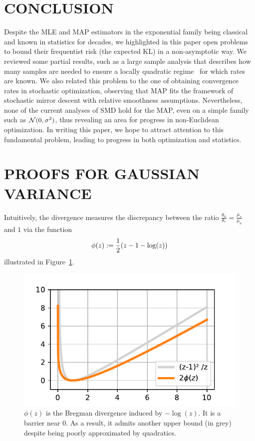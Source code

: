 \documentclass[twoside]{article}
\let\oldsection\section
\renewcommand{\section}[1]{\oldsection{\texorpdfstring{\uppercase{#1}}{#1}}}
\newcommand{\nat}{\theta}
\newcommand{\m}{\mu}
\begin{document}
\section{Conclusion}
Despite the MLE and MAP estimators in the exponential family being classical and known in statistics for decades, we highlighted in this paper open problems to bound their frequentist risk (the expected KL) in a non-asymptotic way. We reviewed some partial results, such as a large sample analysis that describes how many samples are needed to ensure a locally quadratic regime~\citep{kakade2010learning, ostrovskii2021finite} for which rates are known. We also related this problem to the one of obtaining convergence rates in stochastic optimization, observing that MAP fits the framework of stochastic mirror descent with relative smoothness assumptions. 
Nevertheless, none of the current analyses of SMD hold for the MAP, even on a simple family such as ${\mathcal N}(0,\sigma^2)$, thus revealing an area for progress in non-Euclidean optimization.
In writing this paper, we hope to attract attention to this fundamental problem, leading to progress in both optimization and statistics.



\newpage




\clearpage
\appendix
\onecolumn

\section{PROOFS FOR GAUSSIAN VARIANCE}
\label{app:gaussian-variance}

Intuitively, the divergence measures the discrepancy between the ratio $\frac{ \nat_n}{\nat_*} =  \frac{\m_*}{ \m_n}  $ and $1$ via the function
\begin{align}
	\phi(z) := \frac{1}{2} (z - 1 - \log(z))
\end{align}
illustrated in Figure~\ref{fig:phi}.
\begin{figure}[ht]
	\centering
	\includegraphics[width=.4\textwidth]{phi.pdf}
	\caption{$\phi(z)$ is the Bregman divergence induced by $-\log(z)$. It is a barrier near $0$. As a result, it admits another upper bound (in grey) despite being poorly approximated by quadratics.}
	\label{fig:phi}
\end{figure}
\end{document}

